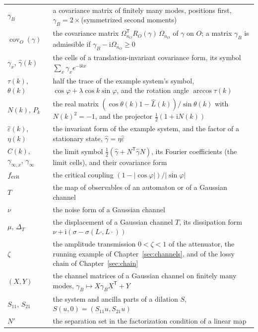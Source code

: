\documentclass[11pt]{article}
\numberwithin{equation}{section}
\theoremstyle{definition}
\theoremstyle{remark}
\theoremstyle{plain}
\newcommand{\ii}{\mathrm i}
\DeclareMathOperator{\cov}{cov}
\newcommand{\reve}[1]{#1}
\begin{document}
\begin{center}
\begin{tabular}{@{}l>{\raggedright\arraybackslash}p{}@{}}
\reve{$\gamma_B$} & \reve{a covariance matrix of finitely many modes, positions first, $\gamma_B=2\times$(symmetrized second moments)} \\
\reve{$\cov_O(\gamma)$} & \reve{the covariance matrix $\Omega_{n_O}^{\mathsf T}R_O(\gamma)\,\Omega_{n_O}$ of $\gamma$ on $O$; a matrix $\gamma_B$ is admissible if $\gamma_B-\ii\Omega_{n_O}\ge0$} \\
\reve{$\gamma_x$, $\hat\gamma(k)$} & \reve{the cells of a translation-invariant covariance form, its symbol $\sum_x\gamma_xe^{-\ii kx}$} \\
\reve{$\tau(k)$, $\theta(k)$} & \reve{half the trace of the example system's symbol, $\cos\varphi+\lambda\cos k\sin\varphi$, and the rotation angle $\arccos\tau(k)$} \\
\reve{$N(k)$, $P_k$} & \reve{the real matrix $(\cos\theta(k)1-\hat L(k))/\sin\theta(k)$ with $N(k)^2=-1$, and the projector $\tfrac12(1+\ii N(k))$} \\
\reve{$\hat\varepsilon(k)$, $\eta(k)$} & \reve{the invariant form of the example system, and the factor of a stationary state, $\hat\gamma=\eta\hat\varepsilon$} \\
\reve{$C(k)$, $\gamma_{\infty,x}$, $\gamma_\infty$} & \reve{the limit symbol $\frac12(\hat\gamma+N^{\mathsf T}\hat\gamma N)$, its Fourier coefficients (the limit cells), and their covariance form} \\
\reve{$f_{\rm crit}$} & \reve{the critical coupling $(1-|\cos\varphi|)/|\sin\varphi|$} \\
\reve{$T$} & \reve{the map of observables of an automaton or of a Gaussian channel} \\
\reve{$\nu$} & \reve{the noise form of a Gaussian channel} \\
\reve{$\mu$, $\Delta_T$} & \reve{the displacement of a Gaussian channel $T$, its dissipation form $\nu+\ii(\sigma-\sigma(L\cdot,L\cdot))$} \\
\reve{$\zeta$} & \reve{the amplitude transmission $0<\zeta<1$ of the attenuator, the running example of Chapter~\ref{sec:channels}}\reve{, and of the lossy chain of Chapter~\ref{sec:chain}} \\
\reve{$(X,Y)$} & \reve{the channel matrices of a Gaussian channel on finitely many modes, $\gamma_B\mapsto X\gamma_BX^{\mathsf T}+Y$} \\
\reve{$S_{11}$, $S_{21}$} & \reve{the system and ancilla parts of a dilation $S$, $S(u,0)=(S_{11}u,S_{21}u)$} \\
\reve{$N'$} & \reve{the separation set in the factorization condition of} \reve{a linear map} \\

\end{tabular}
\end{center}
\end{document}
